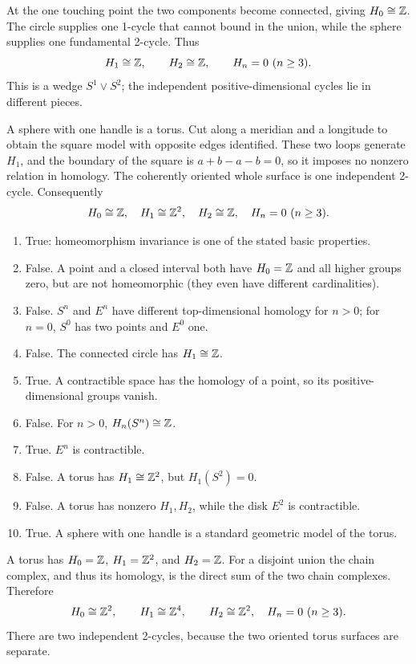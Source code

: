 At the one touching point the two components become connected, giving $H_0\cong\mathbb{Z}$. The circle supplies one 1-cycle that cannot bound in the union, while the sphere supplies one fundamental 2-cycle. Thus
\[
H_1\cong\mathbb{Z},\qquad H_2\cong\mathbb{Z},
\qquad H_n=0\ (n\ge3).
\]
This is a wedge $S^1\vee S^2$; the independent positive-dimensional cycles lie in different pieces.

A sphere with one handle is a torus. Cut along a meridian and a longitude to obtain the square model with opposite edges identified. These two loops generate $H_1$, and the boundary of the square is $a+b-a-b=0$, so it imposes no nonzero relation in homology.
The coherently oriented whole surface is one independent 2-cycle. Consequently
\[
H_0\cong\mathbb{Z},\quad H_1\cong\mathbb{Z}^2,\quad H_2\cong\mathbb{Z},
\quad H_n=0\ (n\ge3).
\]

\begin{enumerate}[label=\textbf{(\alph*)}]
\item True: homeomorphism invariance is one of the stated basic properties.
\item False. A point and a closed interval both have $H_0=\mathbb{Z}$ and all higher groups zero, but are not homeomorphic (they even have different cardinalities).
\item False. $S^n$ and $E^n$ have different top-dimensional homology for $n>0$; for $n=0$, $S^0$ has two points and $E^0$ one.
\item False. The connected circle has $H_1\cong\mathbb{Z}$.
\item True. A contractible space has the homology of a point, so its positive-dimensional groups vanish.
\item False. For $n>0$, $H_n(S^n)\cong\mathbb{Z}$.
\item True. $E^n$ is contractible.
\item False. A torus has $H_1\cong\mathbb{Z}^2$, but $H_1(S^2)=0$.
\item False. A torus has nonzero $H_1,H_2$, while the disk $E^2$ is contractible.
\item True. A sphere with one handle is a standard geometric model of the torus.
\end{enumerate}

A torus has $H_0=\mathbb{Z}$, $H_1=\mathbb{Z}^2$, and $H_2=\mathbb{Z}$. For a disjoint union the chain complex, and thus its homology, is the direct sum of the two chain complexes. Therefore
\[
H_0\cong\mathbb{Z}^2,\qquad H_1\cong\mathbb{Z}^4,\qquad H_2\cong\mathbb{Z}^2,
\quad H_n=0\ (n\ge3).
\]
There are two independent 2-cycles, because the two oriented torus surfaces are separate.

